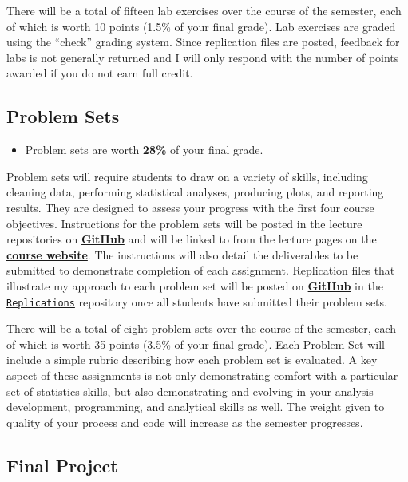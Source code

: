 \documentclass[]{book}
\newenvironment{rmdblock}[1]
  {\begin{shaded*}
  \begin{itemize}
  \renewcommand{\labelitemi}{
    \raisebox{-.7\height}[0pt][0pt]{
      {\setkeys{Gin}{width=3em,keepaspectratio}\texttt{[image: images/\#1]}}
    }
  }
  \item
  }
  {
  \end{itemize}
  \end{shaded*}
  }
\newenvironment{rmdtip}
  {\begin{rmdblock}{tip}}
  {\end{rmdblock}}
\theoremstyle{definition}
\theoremstyle{definition}
\theoremstyle{definition}
\theoremstyle{remark}
\begin{document}
There will be a total of fifteen lab exercises over the course of the
semester, each of which is worth 10 points (1.5\% of your final grade).
Lab exercises are graded using the ``check'' grading system. Since
replication files are posted, feedback for labs is not generally
returned and I will only respond with the number of points awarded if
you do not earn full credit.

\hypertarget{problem-sets}{%
\subsection{Problem Sets}\label{problem-sets}}

\begin{rmdtip}
Problem sets are worth \textbf{28\%} of your final grade.
\end{rmdtip}

Problem sets will require students to draw on a variety of skills,
including cleaning data, performing statistical analyses, producing
plots, and reporting results. They are designed to assess your progress
with the first four course objectives. Instructions for the problem sets
will be posted in the lecture repositories on
\href{https://github.com/slu-soc5050}{\textbf{GitHub}} and will be
linked to from the lecture pages on the
\href{https://slu-soc5050.github.io/}{\textbf{course website}}. The
instructions will also detail the deliverables to be submitted to
demonstrate completion of each assignment. Replication files that
illustrate my approach to each problem set will be posted on
\href{https://github.com/slu-soc5050}{\textbf{GitHub}} in the
\href{https://github.com/slu-soc5050/Replications}{\texttt{Replications}}
repository once all students have submitted their problem sets.

There will be a total of eight problem sets over the course of the
semester, each of which is worth 35 points (3.5\% of your final grade).
Each Problem Set will include a simple rubric describing how each
problem set is evaluated. A key aspect of these assignments is not only
demonstrating comfort with a particular set of statistics skills, but
also demonstrating and evolving in your analysis development,
programming, and analytical skills as well. The weight given to quality
of your process and code will increase as the semester progresses.

\hypertarget{final-project}{%
\subsection{Final Project}\label{final-project}}
\end{document}

